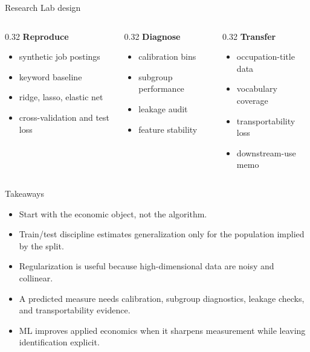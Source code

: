 \documentclass[aspectratio=169,11pt]{beamer}
\newcommand{\1}{\mathbf{1}}
\begin{document}
\begin{frame}{Research Lab design}
\begin{columns}[T,onlytextwidth]
\begin{column}{0.32\linewidth}
\textbf{Reproduce}
\begin{itemize}
    \item synthetic job postings
    \item keyword baseline
    \item ridge, lasso, elastic net
    \item cross-validation and test loss
\end{itemize}
\end{column}
\begin{column}{0.32\linewidth}
\textbf{Diagnose}
\begin{itemize}
    \item calibration bins
    \item subgroup performance
    \item leakage audit
    \item feature stability
\end{itemize}
\end{column}
\begin{column}{0.32\linewidth}
\textbf{Transfer}
\begin{itemize}
    \item occupation-title data
    \item vocabulary coverage
    \item transportability loss
    \item downstream-use memo
\end{itemize}
\end{column}
\end{columns}
\end{frame}

\begin{frame}{Takeaways}
\begin{itemize}
    \item Start with the economic object, not the algorithm.
    \item Train/test discipline estimates generalization only for the population implied by the split.
    \item Regularization is useful because high-dimensional data are noisy and collinear.
    \item A predicted measure needs calibration, subgroup diagnostics, leakage checks, and transportability evidence.
    \item ML improves applied economics when it sharpens measurement while leaving identification explicit.
\end{itemize}
\end{frame}
\end{document}
